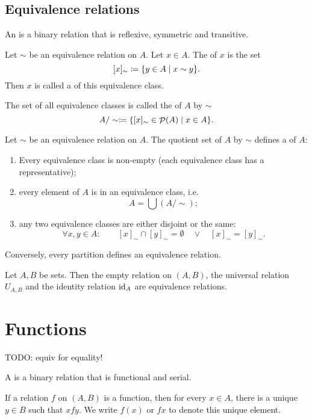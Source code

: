 \subsection{Equivalence relations}
\begin{definition}
An  is a binary relation that is reflexive, symmetric and transitive.

Let $\sim$ be an equivalence relation on $A$. Let $x\in A$. The  of $x$ is the set
\[ [x]_\sim \coloneqq \{ y\in A\;|\; x\sim y \}. \]
Then $x$ is called a  of this equivalence class.

The set of all equivalence classes is called the  of $A$ by $\sim$
\[ A/\sim \coloneqq \{ [x]_\sim \in \mathop{\mathcal{P}}(A) \;|\; x\in A \}. \]
\end{definition}
\begin{proposition}
Let $\sim$ be an equivalence relation on $A$. The quotient set of $A$ by $\sim$ defines a  of $A$:
\begin{enumerate}
\item Every equivalence class is non-empty (each equivalence class has a representative);
\item every element of $A$ is in an equivalence class, i.e.
\[ A = \bigcup (A/\sim); \]
\item any two equivalence classes are either disjoint or the same:
\[ \forall x,y\in A: \qquad[x]_\sim \cap [y]_\sim = \emptyset \quad \lor \quad [x]_\sim = [y]_\sim. \]
\end{enumerate}
Conversely, every partition defines an equivalence relation.
\end{proposition}

\begin{lemma}
Let $A,B$ be sets. Then the empty relation on $(A,B)$, the universal relation $U_{A,B}$ and the identity relation $\operatorname{id}_A$ are equivalence relations.
\end{lemma}

\section{Functions}
TODO: equiv for equality!

\begin{definition}
A  is a binary relation that is functional and serial.
\end{definition}
If a relation $f$ on $(A, B)$ is a function, then for every $x\in A$, there is a unique $y\in B$ such that $xfy$. We write $f(x)$ or $fx$ to denote this unique element.

